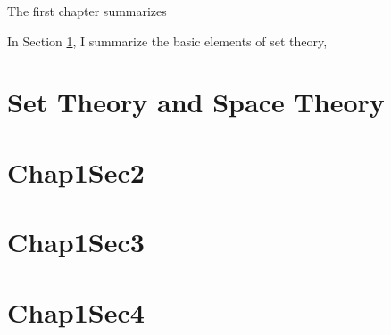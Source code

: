 \minitoc

\vspace{0.5cm}
The first chapter summarizes 

In Section \ref{chap1:set_space}, I summarize the basic elements of set theory, 

\section{Set Theory and Space Theory}\label{chap1:set_space}


\section{Chap1Sec2}\label{chap1:sec2}


\section{Chap1Sec3}\label{chap1:sec3}

\section{Chap1Sec4}\label{chap1:sec4}

